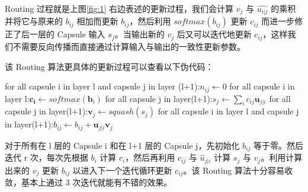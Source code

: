 Routing 过程就是上图\ref{fig:1} 右边表述的更新过程，我们会计算 $v_j$ 与 $\hat{u_{i|j}}$ 的乘积并将它与原来的 $b_{ij}$ 相加而更新 $b_{ij}$，然后利用 $softmax(b_{ij})$ 更新 $c_{ij}$ 而进一步修正了后一层的 Capsule 输入 $s_j$。当输出新的 $v_j$ 后又可以迭代地更新 $c_{ij}$，这样我们不需要反向传播而直接通过计算输入与输出的一致性更新参数。

该 Routing 算法更具体的更新过程可以查看以下伪代码：
%
\begin{algorithm}
	\begin{algorithmic}[1] 
		\State for all capsule i in layer l and capsule j in layer (l+1):$n_{ij}\leftarrow 0$
		\State for all capsule i in layer l:$\mathbf{c_i}\leftarrow softmax(\mathbf{b}_i)$
		\State 	for all capsule j in layer(l+1):$s_j\leftarrow \sum_ic_{ij}\mathbf{u}_{j|i}$
		\State  for all capsule j in layer(l+1):$\mathbf{v}_j\leftarrow squash(s_j)$
	        \State for all capsule i in layer l and capsule j in layer(l+1):$b_{ij}\leftarrow b_{ij}+\mathbf{u}_{j|i}\mathbf{v}_j$
	\EndFor
	\EndProcedure
	\end{algorithmic} 
\end{algorithm}
对于所有在 l 层的 Capsule i 和在 l+1 层的 Capsule j，先初始化 $b_{ij}$ 等于零。然后迭代 r 次，每次先根据 $b_i$ 计算 $c_i$，然后再利用 $c_{ij}$ 与 $\hat{u}_{j|i}$ 计算 $s_j$ 与 $v_j$。利用计算出来的 $v_j$ 更新 $b_{ij}$ 以进入下一个迭代循环更新 $c_{ij}$。该 Routing 算法十分容易收敛，基本上通过 3 次迭代就能有不错的效果。

